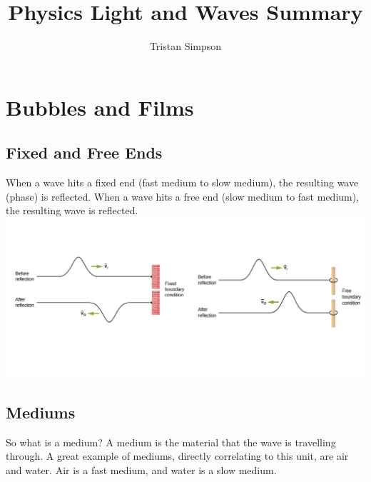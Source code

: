 \documentclass{article}
\title{Physics Light and Waves Summary}
\author{Tristan Simpson}
\begin{document}
\maketitle
\tableofcontents

\vspace{1\textwidth}
\section{Bubbles and Films}
\subsection{Fixed and Free Ends}
When a wave hits a fixed end (fast medium to slow medium), the resulting wave (phase) is reflected. When a wave hits a free end (slow medium to fast medium), the resulting wave is reflected.\\
\includegraphics[scale=3]{images/fixed_free_ends} \\
\vspace{-2cm}
\subsection{Mediums}
So what is a medium? A medium is the material that the wave is travelling through. A great example of mediums, directly correlating to this unit, are air and water. Air is a fast medium, and water is a slow medium.\\
\end{document}
